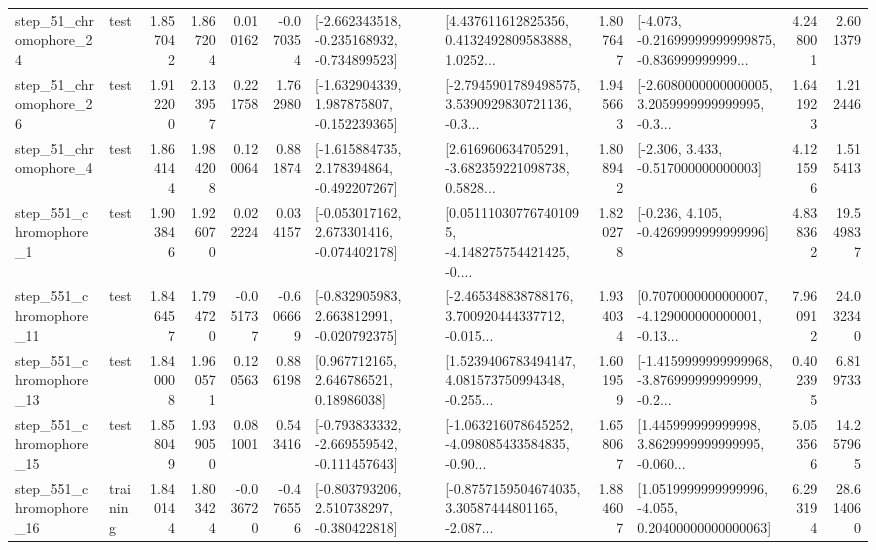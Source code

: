 \begin{tabular}{llrrrrllrlrr}
   step\_51\_chromophore\_24 &      test &      1.857042 &    1.867204 &      0.010162 & -0.070354 &  [-2.662343518, -0.235168932, -0.734899523] &  [4.437611612825356, 0.4132492809583888, 1.0252... &       1.807647 &  [-4.073, -0.21699999999999875, -0.836999999999... &            4.248001 &          2.601379 \\
   step\_51\_chromophore\_26 &      test &      1.912200 &    2.133957 &      0.221758 &  1.762980 &   [-1.632904339, 1.987875807, -0.152239365] &  [-2.7945901789498575, 3.5390929830721136, -0.3... &       1.945663 &  [-2.6080000000000005, 3.2059999999999995, -0.3... &            1.641923 &          1.212446 \\
    step\_51\_chromophore\_4 &      test &      1.864144 &    1.984208 &      0.120064 &  0.881874 &   [-1.615884735, 2.178394864, -0.492207267] &  [2.616960634705291, -3.682359221098738, 0.5828... &       1.808942 &                [-2.306, 3.433, -0.517000000000003] &            4.121596 &          1.515413 \\
   step\_551\_chromophore\_1 &      test &      1.903846 &    1.926070 &      0.022224 &  0.034157 &   [-0.053017162, 2.673301416, -0.074402178] &  [0.051110307767401095, -4.148275754421425, -0.... &       1.820278 &               [-0.236, 4.105, -0.4269999999999996] &            4.838362 &         19.549837 \\
  step\_551\_chromophore\_11 &      test &      1.846457 &    1.794720 &     -0.051737 & -0.606669 &   [-0.832905983, 2.663812991, -0.020792375] &  [-2.465348838788176, 3.700920444337712, -0.015... &       1.934034 &  [0.7070000000000007, -4.129000000000001, -0.13... &            7.960912 &         24.032340 \\
  step\_551\_chromophore\_13 &      test &      1.840008 &    1.960571 &      0.120563 &  0.886198 &      [0.967712165, 2.646786521, 0.18986038] &  [1.5239406783494147, 4.081573750994348, -0.255... &       1.601959 &  [-1.4159999999999968, -3.876999999999999, -0.2... &            0.402395 &          6.819733 \\
  step\_551\_chromophore\_15 &      test &      1.858049 &    1.939050 &      0.081001 &  0.543416 &  [-0.793833332, -2.669559542, -0.111457643] &  [-1.063216078645252, -4.098085433584835, -0.90... &       1.658067 &  [1.445999999999998, 3.8629999999999995, -0.060... &            5.053566 &         14.257965 \\
  step\_551\_chromophore\_16 &  training &      1.840144 &    1.803424 &     -0.036720 & -0.476556 &   [-0.803793206, 2.510738297, -0.380422818] &  [-0.8757159504674035, 3.30587444801165, -2.087... &       1.884607 &  [1.0519999999999996, -4.055, 0.20400000000000063] &            6.293194 &         28.614060 \\

\end{tabular}
